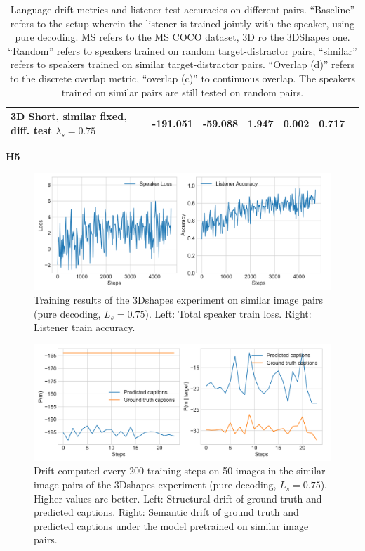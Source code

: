 \begin{table}[]
\begin{tabularx}{\textwidth}{|X|l|l|X|X|X|X|}
		3D Short, similar fixed, diff. test $\lambda_s = 0.75$&     -191.051        &        -59.088           &   1.947        &        0.002          &        0.717                               &                                           \\ \hline
	\end{tabularx}
	\caption{\label{tab:3dshapes_drift_metrics_basic_similar} Language drift metrics and listener test accuracies on different pairs. 
		``Baseline'' refers to the setup wherein the listener is trained jointly with the speaker, using pure decoding. MS refers to the MS COCO dataset, 3D ro the 3DShapes one. ``Random'' refers to speakers trained on random target-distractor pairs; ``similar'' refers to speakers trained on similar target-distractor pairs. ``Overlap (d)'' refers to the discrete overlap metric, ``overlap (c)'' to continuous overlap. The speakers trained on similar pairs are still tested on random pairs.}
\end{table}

\textbf{H5}

\begin{figure}
	\centering
	\includegraphics[width=\linewidth]{images/3dshapes_refgame_49_pure_075_similar.png}
	\caption{Training results of the 3Dshapes experiment on similar image pairs (pure decoding, $L_s = 0.75$). Left: Total speaker train loss. Right: Listener train accuracy.}
	\label{fig:3dshapes_similar_075_speaker_loss_listener_acc}
\end{figure}


\begin{figure}
	\centering
	\includegraphics[width=\linewidth]{images/3dshapes_structural_semantic_drift_4000_pure_075_similar.png}
	\caption{Drift computed every 200 training steps on 50 images in the similar image pairs of the 3Dshapes experiment (pure decoding, $L_s = 0.75$). Higher values are better. Left: Structural drift of ground truth and predicted captions. Right: Semantic drift of ground truth and predicted captions under the model pretrained on similar image pairs.} 
	\label{fig:3dshapes_similar_075_str_sem_drift}
\end{figure}

